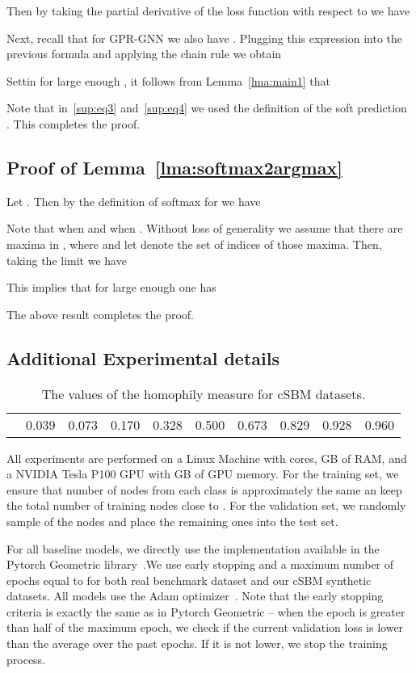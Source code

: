 \documentclass{article} \usepackage{iclr2021_conference,times}
\begin{document}
Then by taking the partial derivative of the loss function with respect to  we have

Next, recall that for GPR-GNN we also have . Plugging this expression into the previous formula and applying the chain rule we obtain

Settin  for large enough , it follows from Lemma~\ref{lma:main1} that

Note that in~\eqref{sup:eq3} and~\eqref{sup:eq4} we used the definition of the soft prediction . This completes the proof.

\subsection{Proof of Lemma~\ref{lma:softmax2argmax}}
Let . Then by the definition of softmax for  we have

Note that  when  and  when . Without loss of generality we assume that there are  maxima in , where  and let  denote the set of indices of those maxima. Then, taking the limit  we have

This implies that for  large enough one has

The above result completes the proof.

\subsection{Additional Experimental details}

\begin{table}[ht]
\centering
\small
\caption{The values of the homophily measure for cSBM datasets.}
\vspace{0.05in}
\begin{tabular}[t]{c|ccccccccc}
 &  &  &    &  &  &  &  &  & \\
\midrule
 &0.039  &0.073   &0.170   &0.328   &0.500   &0.673   &0.829   &0.928   &0.960   \\
\end{tabular}
\normalsize
\end{table}

All experiments are performed on a Linux Machine with  cores, GB of RAM, and a NVIDIA Tesla P100 GPU with GB of GPU memory. For the training set, we ensure that number of nodes from each class is approximately the same an keep the total number of training nodes close to . For the validation set, we randomly sample  of the nodes and place the remaining ones into the test set.

For all baseline models, we directly use the implementation available in the Pytorch Geometric library~\cite{fey2019fast}.We use early stopping  and a maximum number of epochs equal to  for both real benchmark dataset and our cSBM synthetic datasets. All models use the Adam optimizer~\cite{kingma2014adam}. Note that the early stopping criteria is exactly the same as in Pytorch Geometric -- when the epoch is greater than half of the maximum epoch, we check if the current validation loss is lower than the average over the past  epochs. If it is not lower, we stop the training process.
\end{document}
